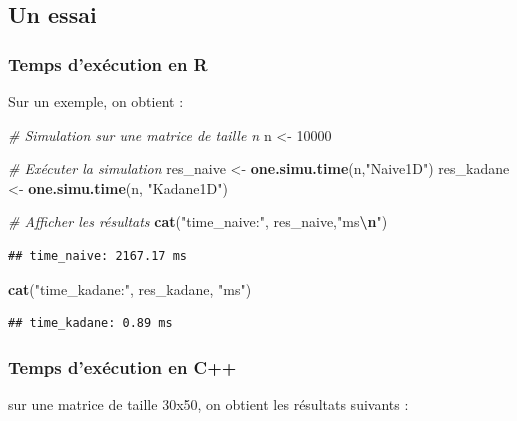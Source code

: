 \documentclass[
]{article}
\newenvironment{Shaded}{\begin{snugshade}}{\end{snugshade}}
\newcommand{\CommentTok}[1]{\textcolor[rgb]{0.56,0.35,0.01}{\textit{#1}}}
\newcommand{\DecValTok}[1]{\textcolor[rgb]{0.00,0.00,0.81}{#1}}
\newcommand{\FunctionTok}[1]{\textcolor[rgb]{0.13,0.29,0.53}{\textbf{#1}}}
\newcommand{\NormalTok}[1]{#1}
\newcommand{\OtherTok}[1]{\textcolor[rgb]{0.56,0.35,0.01}{#1}}
\newcommand{\SpecialCharTok}[1]{\textcolor[rgb]{0.81,0.36,0.00}{\textbf{#1}}}
\newcommand{\StringTok}[1]{\textcolor[rgb]{0.31,0.60,0.02}{#1}}
\begin{document}
\subsection{Un essai}\label{un-essai}

\subsubsection{Temps d'exécution en R}\label{temps-dexuxe9cution-en-r}

Sur un exemple, on obtient :

\begin{Shaded}
\begin{Highlighting}[]
\CommentTok{\# Simulation sur une matrice de taille n}
\NormalTok{n }\OtherTok{\textless{}{-}} \DecValTok{10000}

\CommentTok{\# Exécuter la simulation}
\NormalTok{res\_naive }\OtherTok{\textless{}{-}} \FunctionTok{one.simu.time}\NormalTok{(n,}\StringTok{"Naive1D"}\NormalTok{)}
\NormalTok{res\_kadane }\OtherTok{\textless{}{-}} \FunctionTok{one.simu.time}\NormalTok{(n, }\StringTok{"Kadane1D"}\NormalTok{)}

\CommentTok{\# Afficher les résultats}
\FunctionTok{cat}\NormalTok{(}\StringTok{"time\_naive:"}\NormalTok{, res\_naive,}\StringTok{"ms}\SpecialCharTok{\textbackslash{}n}\StringTok{"}\NormalTok{)}
\end{Highlighting}
\end{Shaded}

\begin{verbatim}
## time_naive: 2167.17 ms
\end{verbatim}

\begin{Shaded}
\begin{Highlighting}[]
\FunctionTok{cat}\NormalTok{(}\StringTok{"time\_kadane:"}\NormalTok{, res\_kadane, }\StringTok{"ms"}\NormalTok{)}
\end{Highlighting}
\end{Shaded}

\begin{verbatim}
## time_kadane: 0.89 ms
\end{verbatim}

\subsubsection{Temps d'exécution en C++}\label{temps-dexuxe9cution-en-c}

sur une matrice de taille 30x50, on obtient les résultats suivants :
\end{document}
